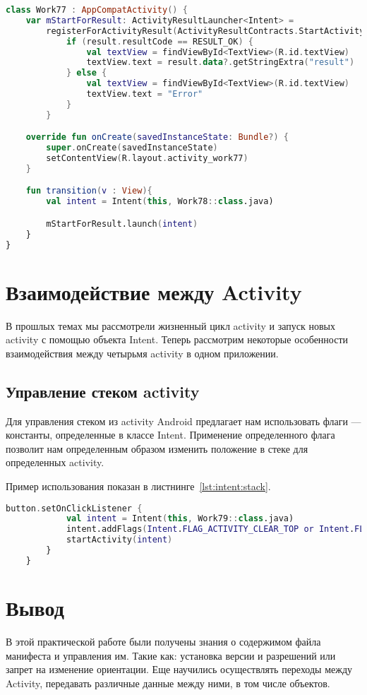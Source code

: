 \begin{lstlisting}[language=Kotlin, caption=\leftline{}, label=lst:activity_result]
class Work77 : AppCompatActivity() {
    var mStartForResult: ActivityResultLauncher<Intent> =
        registerForActivityResult(ActivityResultContracts.StartActivityForResult()) { result ->
            if (result.resultCode == RESULT_OK) {
                val textView = findViewById<TextView>(R.id.textView)
                textView.text = result.data?.getStringExtra("result")
            } else {
                val textView = findViewById<TextView>(R.id.textView)
                textView.text = "Error"
            }
        }

    override fun onCreate(savedInstanceState: Bundle?) {
        super.onCreate(savedInstanceState)
        setContentView(R.layout.activity_work77)
    }

    fun transition(v : View){
        val intent = Intent(this, Work78::class.java)

        mStartForResult.launch(intent)
    }
}
\end{lstlisting}

\section{Взаимодействие между Activity}
В прошлых темах мы рассмотрели жизненный цикл activity и запуск новых
activity с помощью объекта Intent. Теперь рассмотрим некоторые
особенности взаимодействия между четырьмя activity в одном приложении.

\subsection{Управление стеком activity}
Для управления стеком из activity Android предлагает нам использовать
флаги --- константы, определенные в классе Intent. Применение
определенного флага позволит нам определенным образом изменить
положение в стеке для определенных activity.\par
Пример использования показан в листнинге~\ref{lst:intent:stack}.
\begin{lstlisting}[language=Kotlin, caption=\leftline{}, label=lst:intent:stack]
	button.setOnClickListener {
            val intent = Intent(this, Work79::class.java)
            intent.addFlags(Intent.FLAG_ACTIVITY_CLEAR_TOP or Intent.FLAG_ACTIVITY_SINGLE_TOP)
            startActivity(intent)
        }
    }
\end{lstlisting}

\clearpage

\section*{\LARGE{Вывод}}
В этой практической работе были получены знания о содержимом файла
манифеста и управления им. Такие как: установка версии и разрешений или
запрет на изменение ориентации. Еще научились осуществлять переходы
между Activity, передавать различные данные между ними, в том числе
объектов.

